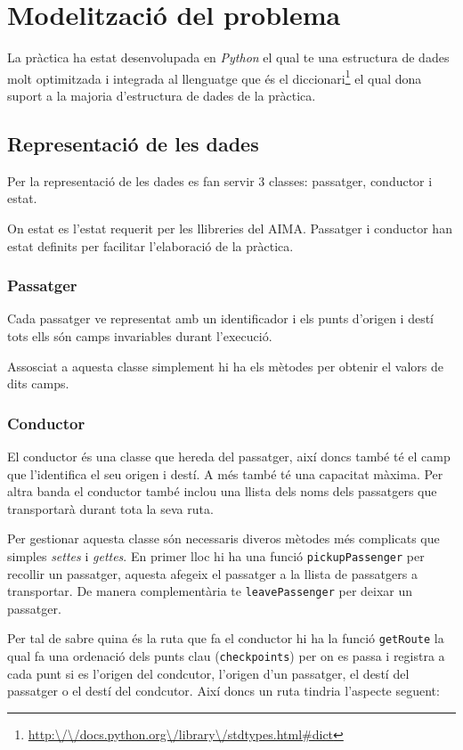 \section{Modelització del problema}
La pràctica ha estat desenvolupada en \emph{Python} el qual te una estructura de dades molt optimitzada
i integrada al llenguatge que és el diccionari\footnote{\url{http:\/\/docs.python.org\/library\/stdtypes.html\#dict}}
el qual dona suport a la majoria d'estructura de dades de la pràctica.

\subsection{Representació de les dades}
Per la representació de les dades es fan servir 3 classes: passatger, conductor i estat.

On estat es l'estat requerit per les llibreries del AIMA. Passatger i conductor han estat
definits per facilitar l'elaboració de la pràctica.

\subsubsection{Passatger}
Cada passatger ve representat amb un identificador i els punts d'origen i destí tots ells són
camps invariables durant l'execució.

Assosciat a aquesta classe simplement hi ha els mètodes per obtenir el valors de dits camps.

\subsubsection{Conductor}
El conductor és una classe que hereda del passatger, així doncs també té el camp que l'identifica
el seu origen i destí. A més també té una capacitat màxima.
Per altra banda el conductor també inclou una llista dels noms dels passatgers que transportarà
durant tota la seva ruta.

Per gestionar aquesta classe són necessaris diveros mètodes més complicats que simples \emph{settes} i \emph{gettes}.
En primer lloc hi ha una funció \texttt{pickupPassenger} per recollir un passatger, aquesta afegeix el passatger
a la llista de passatgers a transportar. De manera complementària te \texttt{leavePassenger} per deixar un 
passatger.

Per tal de sabre quina és la ruta que fa el conductor hi ha la funció \texttt{getRoute} la qual
fa una ordenació dels punts clau (\texttt{checkpoints}) per on es passa i registra a cada punt si es
l'origen del condcutor, l'origen d'un passatger, el destí del passatger o el destí del condcutor. Així
doncs un ruta tindria l'aspecte seguent: 


